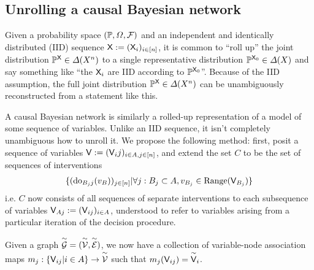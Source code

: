 \subsection{Unrolling a causal Bayesian network}

Given a probability space $(\mathbb{P},\Omega,\mathcal{F})$ and an independent and identically distributed (IID) sequence $\mathsf{X}:=(\mathsf{X}_i)_{i\in [n]}$, it is common to ``roll up'' the joint distribution $\mathbb{P}^{\mathsf{X}}\in\Delta(X^n)$ to a single representative distribution $\mathbb{P}^{\mathsf{X}_0}\in \Delta(X)$ and say something like ``the $\mathsf{X}_i$ are IID according to $\mathbb{P}^{\mathsf{X}_0}$''. Because of the IID assumption, the full joint distribution $\mathbb{P}^{\mathsf{X}}\in\Delta(X^n)$ can be unambiguously reconstructed from a statement like this.

A causal Bayesian network is similarly a rolled-up representation of a model of some sequence of variables. Unlike an IID sequence, it isn't completely unambiguous how to unroll it. We propose the following method: first, posit a sequence of variables $\mathsf{V}:= (\mathsf{V}_ij)_{i\in A,j\in [n]}$, and extend the set $C$ to be the set of sequences of interventions 
\begin{align}
\{(\mathrm{do}_{B_j j}(v_B))_{j\in [n]}|\forall j: B_j \subset A,v_{B_j}\in \mathrm{Range}(\mathsf{V}_{B_j})\}
\end{align}
i.e. $C$ now consists of all sequences of separate interventions to each subsequence of variables $\mathsf{V}_{Aj}:=(\mathsf{V}_{ij})_{i\in A}$, understood to refer to variables arising from a particular iteration of the decision procedure. 

Given a graph $\overset{\sim}{\mathcal{G}}=(\overset{\sim}{\mathcal{V}},\overset{\sim}{\mathcal{E}})$, we now have a collection of variable-node association maps $m_j:\{\mathsf{V}_{ij}|i\in A\}\to \overset{\sim}{\mathcal{V}}$ such that $m_j(\mathsf{V}_{ij})=\overset{\sim}{\mathsf{V}}_i$.

